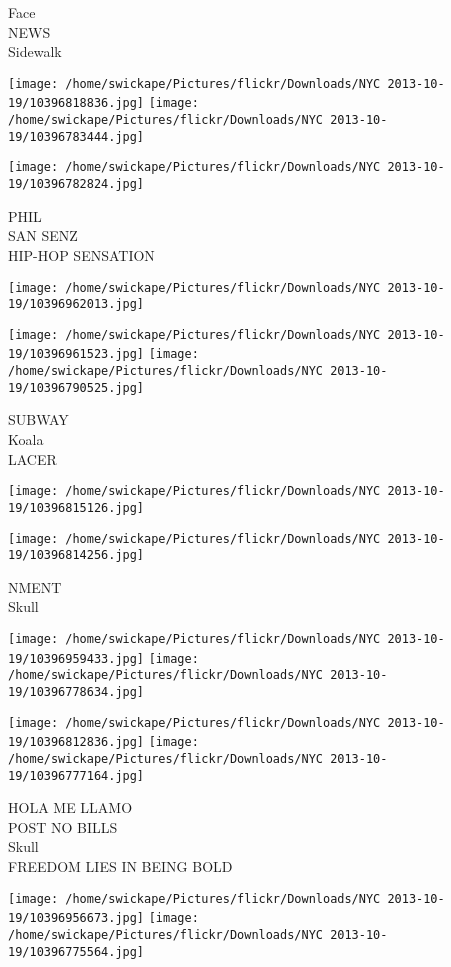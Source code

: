 \documentclass[10pt,letterpaper]{article}
\begin{document}
Face\\
NEWS\\
Sidewalk
\pagebreak

\texttt{[image: /home/swickape/Pictures/flickr/Downloads/NYC 2013-10-19/10396818836.jpg]}
\texttt{[image: /home/swickape/Pictures/flickr/Downloads/NYC 2013-10-19/10396783444.jpg]}

\texttt{[image: /home/swickape/Pictures/flickr/Downloads/NYC 2013-10-19/10396782824.jpg]}

PHIL\\
SAN SENZ\\
HIP{-}HOP SENSATION
\pagebreak

\texttt{[image: /home/swickape/Pictures/flickr/Downloads/NYC 2013-10-19/10396962013.jpg]}

\vspace{0.25in}
\texttt{[image: /home/swickape/Pictures/flickr/Downloads/NYC 2013-10-19/10396961523.jpg]}
\texttt{[image: /home/swickape/Pictures/flickr/Downloads/NYC 2013-10-19/10396790525.jpg]}

SUBWAY\\
Koala\\
LACER
\pagebreak

\texttt{[image: /home/swickape/Pictures/flickr/Downloads/NYC 2013-10-19/10396815126.jpg]}

\vspace{0.25in}
\texttt{[image: /home/swickape/Pictures/flickr/Downloads/NYC 2013-10-19/10396814256.jpg]}

NMENT\\
Skull
\pagebreak

\texttt{[image: /home/swickape/Pictures/flickr/Downloads/NYC 2013-10-19/10396959433.jpg]}
\texttt{[image: /home/swickape/Pictures/flickr/Downloads/NYC 2013-10-19/10396778634.jpg]}

\texttt{[image: /home/swickape/Pictures/flickr/Downloads/NYC 2013-10-19/10396812836.jpg]}
\texttt{[image: /home/swickape/Pictures/flickr/Downloads/NYC 2013-10-19/10396777164.jpg]}

HOLA ME LLAMO\\
POST NO BILLS\\
Skull\\
FREEDOM LIES IN BEING BOLD
\pagebreak

\texttt{[image: /home/swickape/Pictures/flickr/Downloads/NYC 2013-10-19/10396956673.jpg]}
\texttt{[image: /home/swickape/Pictures/flickr/Downloads/NYC 2013-10-19/10396775564.jpg]}
\end{document}
